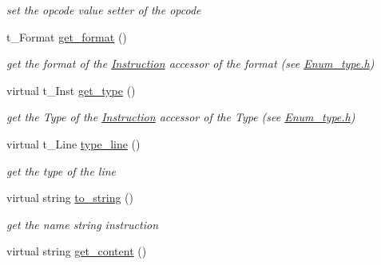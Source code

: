 \begin{DoxyCompactItemize}
\begin{DoxyCompactList}\small\item\em set the opcode value setter of the opcode \end{DoxyCompactList}\item 
\hypertarget{class_instruction_a86e8d9627ad78884d75481693a6196ef}{}t\+\_\+\+Format \hyperlink{class_instruction_a86e8d9627ad78884d75481693a6196ef}{get\+\_\+format} ()\label{class_instruction_a86e8d9627ad78884d75481693a6196ef}

\begin{DoxyCompactList}\small\item\em get the format of the \hyperlink{class_instruction}{Instruction} accessor of the format (see \hyperlink{_enum__type_8h_source}{Enum\+\_\+type.\+h}) \end{DoxyCompactList}\item 
\hypertarget{class_instruction_ae619398c5531b1f2042fb4caa893cdee}{}virtual t\+\_\+\+Inst \hyperlink{class_instruction_ae619398c5531b1f2042fb4caa893cdee}{get\+\_\+type} ()\label{class_instruction_ae619398c5531b1f2042fb4caa893cdee}

\begin{DoxyCompactList}\small\item\em get the Type of the \hyperlink{class_instruction}{Instruction} accessor of the Type (see \hyperlink{_enum__type_8h_source}{Enum\+\_\+type.\+h}) \end{DoxyCompactList}\item 
\hypertarget{class_instruction_adcab5ded0016e613826be14514abbcc8}{}virtual t\+\_\+\+Line \hyperlink{class_instruction_adcab5ded0016e613826be14514abbcc8}{type\+\_\+line} ()\label{class_instruction_adcab5ded0016e613826be14514abbcc8}

\begin{DoxyCompactList}\small\item\em get the type of the line \end{DoxyCompactList}\item 
\hypertarget{class_instruction_aed87de5e9259f4f15dc885425528f1fe}{}virtual string \hyperlink{class_instruction_aed87de5e9259f4f15dc885425528f1fe}{to\+\_\+string} ()\label{class_instruction_aed87de5e9259f4f15dc885425528f1fe}

\begin{DoxyCompactList}\small\item\em get the name string instruction \end{DoxyCompactList}\item 
\hypertarget{class_instruction_a5b258bf1dfb9f6fa2fff0af0e7c211d8}{}virtual string \hyperlink{class_instruction_a5b258bf1dfb9f6fa2fff0af0e7c211d8}{get\+\_\+content} ()\label{class_instruction_a5b258bf1dfb9f6fa2fff0af0e7c211d8}


\end{DoxyCompactItemize}
